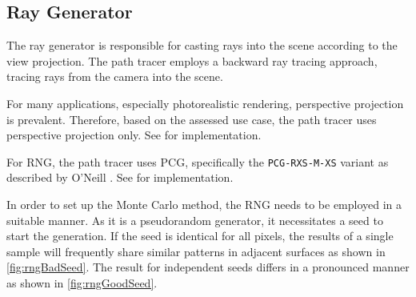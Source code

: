 \subsection*{Ray Generator}

The ray generator is responsible for casting rays into the scene according to the view projection. The path tracer employs a backward ray tracing approach, tracing rays from the camera into the scene.

For many applications, especially photorealistic rendering, perspective projection is prevalent. Therefore, based on the assessed use case, the path tracer uses perspective projection only. See  for implementation.

For \gls{RNG}, the path tracer uses \gls{PCG}, specifically the \texttt{PCG-RXS-M-XS} variant as described by O’Neill \cite{o2014pcg}. See  for implementation.

In order to set up the Monte Carlo method, the \gls{RNG} needs to be employed in a suitable manner. As it is a pseudorandom generator, it necessitates a seed to start the generation. If the seed is identical for all pixels, the results of a single sample will frequently share similar patterns in adjacent surfaces as shown in \autoref{fig:rngBadSeed}. The result for independent seeds differs in a pronounced manner as shown in \autoref{fig:rngGoodSeed}.

